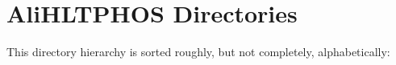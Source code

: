 \section{Ali\-HLTPHOS Directories}
This directory hierarchy is sorted roughly, but not completely, alphabetically:\begin{CompactList}
\item {}
\item {}
\end{CompactList}
